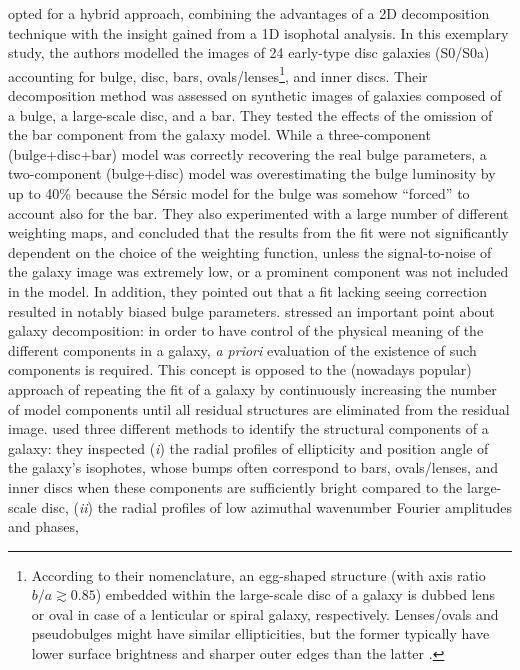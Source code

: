 \cite{laurikainen2005} opted for a hybrid approach, 
combining the advantages of a 2D decomposition technique 
with the insight gained from a 1D isophotal analysis. 
In this exemplary study, the authors modelled the images of 24 early-type disc galaxies (S0/S0a) 
accounting for bulge, disc, bars, ovals/lenses\footnote{According to their nomenclature, 
an egg-shaped structure (with axis ratio $b/a \gtrsim 0.85$) 
embedded within the large-scale disc of a galaxy 
is dubbed lens or oval in case of a lenticular or spiral galaxy, respectively. 
Lenses/ovals and pseudobulges might have similar ellipticities, 
but the former typically have lower surface brightness and sharper outer edges than the latter 
\citep{kormendykennicutt2004}. }, and inner discs. 
Their decomposition method was assessed on synthetic images of galaxies composed of a bulge, 
a large-scale disc, and a bar. 
They tested the effects of the omission of the bar component from the galaxy model. 
While a three-component (bulge+disc+bar) model was correctly recovering the real bulge parameters, 
a two-component (bulge+disc) model was overestimating the bulge luminosity by up to 40\% 
because the S\'ersic model for the bulge was somehow ``forced'' to account also for the bar. 
They also experimented with a large number of different weighting maps, 
and concluded that the results from the fit were not significantly dependent on the choice of the weighting function,
unless the signal-to-noise of the galaxy image was extremely low, 
or a prominent component was not included in the model. 
In addition, they pointed out that a fit lacking seeing correction resulted in notably biased bulge parameters. 
\cite{laurikainen2005} stressed an important point about galaxy decomposition: 
in order to have control of the physical meaning of the different components in a galaxy, 
\emph{a priori} evaluation of the existence of such components is required. 
This concept is opposed to the (nowadays popular) approach of repeating the fit of a galaxy 
by continuously increasing the number of model components 
until all residual structures are eliminated from the residual image.  
\cite{laurikainen2005} used three different methods to identify the structural components of a galaxy:
they inspected (\emph{i}) the radial profiles of ellipticity and position angle of the galaxy's isophotes, 
whose bumps often correspond to bars, ovals/lenses, and inner discs 
when these components are sufficiently bright compared to the large-scale disc, 
(\emph{ii}) the radial profiles of low azimuthal wavenumber Fourier amplitudes and phases, 
